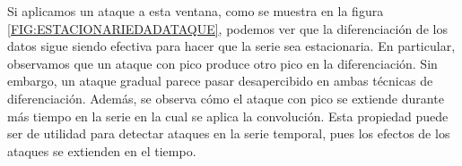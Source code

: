 Si aplicamos un ataque a esta ventana, como se muestra en la figura \ref{FIG:ESTACIONARIEDADATAQUE}, podemos ver que la diferenciación de los datos sigue siendo efectiva para hacer que la serie sea estacionaria. En particular, observamos que un ataque con pico produce otro pico en la diferenciación. Sin embargo, un ataque gradual parece pasar desapercibido en ambas técnicas de diferenciación. Además, se observa cómo el ataque con pico se extiende durante más tiempo en la serie en la cual se aplica la convolución. Esta propiedad puede ser de utilidad para detectar ataques en la serie temporal, pues los efectos de los ataques se extienden en el tiempo.

